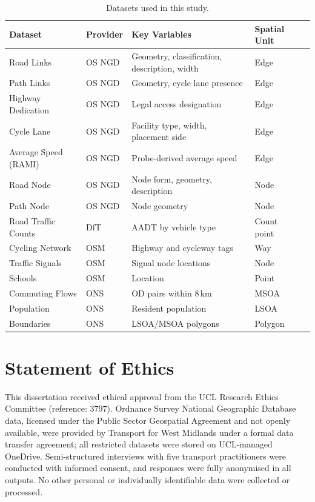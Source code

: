 \begin{table}[H]
  \centering
  \caption{Datasets used in this study.}
  \label{tab:datasets}
  \small
  \begin{tabularx}{\textwidth}{l l X l l}
    \toprule
    \textbf{Dataset} & \textbf{Provider} & \textbf{Key Variables} & \textbf{Spatial Unit}  \\
    \midrule
    Road Links        & OS NGD & Geometry, classification, description, width & Edge \\
    Path Links        & OS NGD & Geometry, cycle lane presence & Edge  \\
    Highway Dedication & OS NGD & Legal access designation & Edge  \\
    Cycle Lane        & OS NGD & Facility type, width, placement side & Edge  \\
    Average Speed (RAMI) & OS NGD & Probe-derived average speed & Edge  \\
    Road Node         & OS NGD & Node form, geometry, description & Node  \\
    Path Node         & OS NGD & Node geometry & Node  \\
    \midrule
    Road Traffic Counts & DfT  & AADT by vehicle type & Count point  \\
    \midrule
    Cycling Network   & OSM   & Highway and cycleway tags & Way  \\
    Traffic Signals   & OSM   & Signal node locations & Node  \\
    Schools           & OSM   & Location & Point  \\
    \midrule
    Commuting Flows   & ONS   & OD pairs within 8\,km & MSOA  \\
    Population        & ONS   & Resident population & LSOA \\
    Boundaries        & ONS   & LSOA/MSOA polygons & Polygon \\
    \bottomrule
  \end{tabularx}
\end{table}

\section{Statement of Ethics}
\label{sec:ethics}

This dissertation received ethical approval from the UCL Research Ethics Committee (reference: 3797). Ordnance Survey National Geographic Database data, licensed under the Public Sector Geospatial Agreement and not openly available, were provided by Transport for West Midlands under a formal data transfer agreement; all restricted datasets were stored on UCL-managed OneDrive. Semi-structured interviews with five transport practitioners were conducted with informed consent, and responses were fully anonymised in all outputs. No other personal or individually identifiable data were collected or processed.